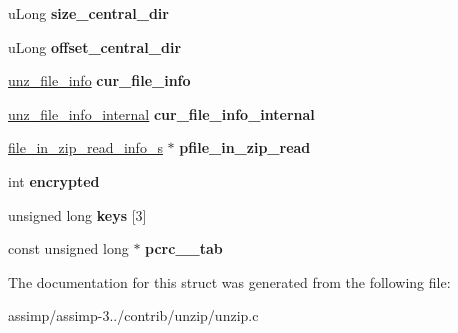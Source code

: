 \begin{DoxyCompactItemize}
\item 
\hypertarget{structunz__s_a60b803a02e17ae46755cb94026ae973a}{u\+Long {\bfseries size\+\_\+central\+\_\+dir}}\label{structunz__s_a60b803a02e17ae46755cb94026ae973a}

\item 
\hypertarget{structunz__s_ac6c37ef70549769fa59bca623565d78f}{u\+Long {\bfseries offset\+\_\+central\+\_\+dir}}\label{structunz__s_ac6c37ef70549769fa59bca623565d78f}

\item 
\hypertarget{structunz__s_ab1963897ac959ca0f9b4208c573c2795}{\hyperlink{structunz__file__info__s}{unz\+\_\+file\+\_\+info} {\bfseries cur\+\_\+file\+\_\+info}}\label{structunz__s_ab1963897ac959ca0f9b4208c573c2795}

\item 
\hypertarget{structunz__s_a36625697385b9a675f02a446fa5ba583}{\hyperlink{structunz__file__info__internal__s}{unz\+\_\+file\+\_\+info\+\_\+internal} {\bfseries cur\+\_\+file\+\_\+info\+\_\+internal}}\label{structunz__s_a36625697385b9a675f02a446fa5ba583}

\item 
\hypertarget{structunz__s_a7a5f0568475ad9a36ee2c1f3972406f0}{\hyperlink{structfile__in__zip__read__info__s}{file\+\_\+in\+\_\+zip\+\_\+read\+\_\+info\+\_\+s} $\ast$ {\bfseries pfile\+\_\+in\+\_\+zip\+\_\+read}}\label{structunz__s_a7a5f0568475ad9a36ee2c1f3972406f0}

\item 
\hypertarget{structunz__s_ae50c5145b776e6b2d68a078adbb9ad52}{int {\bfseries encrypted}}\label{structunz__s_ae50c5145b776e6b2d68a078adbb9ad52}

\item 
\hypertarget{structunz__s_a55d75bacbbaf31b1e796e222c0388f34}{unsigned long {\bfseries keys} \mbox{[}3\mbox{]}}\label{structunz__s_a55d75bacbbaf31b1e796e222c0388f34}

\item 
\hypertarget{structunz__s_a9efa28355c0dec769d07c5a52d70605d}{const unsigned long $\ast$ {\bfseries pcrc\+\_\+\_\+tab}}\label{structunz__s_a9efa28355c0dec769d07c5a52d70605d}

\end{DoxyCompactItemize}


The documentation for this struct was generated from the following file\+:\begin{DoxyCompactItemize}
\item 
assimp/assimp-\/3../contrib/unzip/unzip.\+c\end{DoxyCompactItemize}
